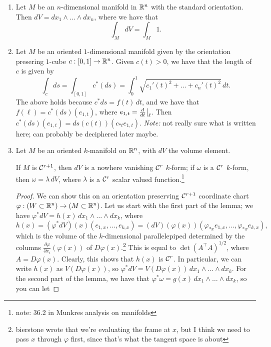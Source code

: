 \begin{enumerate}[label=(\roman*)]
    \item Let $M$ be an $n$-dimensional manifold in $\mathbb R^n$ with the standard orientation. Then $dV = dx_1 \wedge \dots \wedge dx_n$, where we have that
    \[ \int_M dV = \int_M 1. \]
    \item Let $M$ be an oriented $1$-dimensional manifold given by the orientation presering $1$-cube $c : [0, 1] \to \mathbb R^n$. Given $c(t) > 0$, we have that the length of $c$ is given by
    \[ \int_c ds = \int_{[0, 1]} c^\ast(ds) = \int_0^1 \sqrt{c_1'(t)^2 + \dots + c_n'(t)^2} \, dt. \]
    The above holds because $c^\ast ds = f(t) \, dt$, and we have that $f(\ell) = c^\ast(ds)(e_{1,t})$, where $e_{1,t} = \restr{\frac{d}{dt}}{\ell}$. Then $c^\ast(ds)(e_{1,t}) = ds(c(t))(c_{\ast t} e_{1,t})$. \textit{Note:} not really sure what is written here; can probably be deciphered later maybe.
    \item Let $M$ be an oriented $k$-manifold on $\mathbb R^n$, with $dV$ the volume element.
    \begin{simplelemma}
        If $M$ is $\mathcal C^{r+1}$, then $dV$ is a nowhere vanishing $\mathcal C^r$ $k$-form; if $\omega$ is a $\mathcal C^r$ $k$-form, then $\omega = \lambda \, dV$, where $\lambda$ is a $\mathcal C^r$ scalar valued function.\footnote{note: 36.2 in Munkres analysis on manifolds}
    \end{simplelemma}
    \begin{proof}
        We can show this on an orientation preserving $\mathcal C^{r+1}$ coordinate chart $\varphi : (W \subset \mathbb R^n) \to (M \subset \mathbb R^n)$. Let us start with the first part of the lemma; we have $\varphi^\ast dV = h(x) \, dx_1 \wedge \dots \wedge dx_k$, where
        \[ h(x) = (\varphi^\ast dV) (x) (e_{1, x}, \dots, e_{k, x}) = (dV) (\varphi(x)) (\varphi_{\ast x} e_{1, x}, \dots, \varphi_{\ast x} e_{k, x}), \]
        which is the volume of the $k$-dimensional parallelepiped determined by the columns $\frac{\partial \varphi}{\partial x_i}(\varphi(x))$ of $D\varphi(x)$.\footnote{bierstone wrote that we're evaluating the frame at $x$, but I think we need to pass $x$ through $\varphi$ first, since that's what the tangent space is about} This is equal to $\det (A^\top A)^{1/2}$, where $A = D\varphi(x)$. Clearly, this shows that $h(x)$ is $\mathcal C^r$. In particular, we can write $h(x)$ as $V(D\varphi(x))$, so $\varphi^\ast dV = V(D\varphi(x)) \, dx_1 \wedge \dots \wedge dx_k$.
        \medskip\newline
        For the second part of the lemma, we have that $\varphi^\ast \omega = g(x) \, dx_1 \wedge \dots \wedge dx_k$, so you can let

\end{proof}
\end{enumerate}
